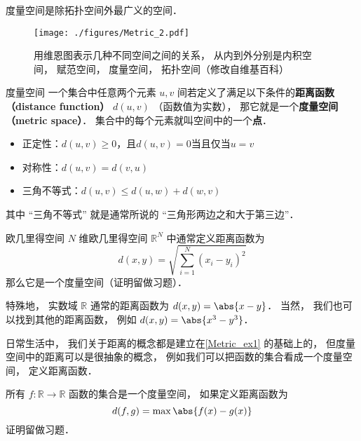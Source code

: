 

度量空间是除拓扑空间外最广义的空间．
\begin{figure}[ht]
\centering
\texttt{[image: ./figures/Metric\_2.pdf]}
\caption{用维恩图表示几种不同空间之间的关系， 从内到外分别是内积空间， 赋范空间， 度量空间， 拓扑空间（修改自维基百科）} \label{Metric_fig2}
\end{figure}

\begin{definition}{度量空间}
一个集合中任意两个元素 $u, v$ 间若定义了满足以下条件的\textbf{距离函数（distance function）} $d(u, v)$ （函数值为实数）， 那它就是一个\textbf{度量空间（metric space）}． 集合中的每个元素就叫空间中的一个\textbf{点}．
\begin{itemize}
\item 正定性：$d(u, v) \geq 0$，且$d(u, v)=0$当且仅当$u=v$
\item 对称性：$d(u, v) = d(v, u)$
\item 三角不等式：$d(u, v) \leqslant d(u, w) + d(w, v)$
\end{itemize}
\end{definition}
其中 “三角不等式” 就是通常所说的 “三角形两边之和大于第三边”． 

\begin{example}{欧几里得空间}\label{Metric_ex1}
$N$ 维欧几里得空间 $\mathbb R^N$ 中通常定义距离函数为
\begin{equation}
d(x, y) = \sqrt{\sum_{i=1}^N (x_i - y_i)^2}
\end{equation}
那么它是一个度量空间（证明留做习题）．

特殊地， 实数域 $\mathbb R$ 通常的距离函数为 $d(x, y) = \abs{x - y}$． 当然， 我们也可以找到其他的距离函数， 例如 $d(x, y) = \abs{x^3 - y^3}$．
\end{example}

日常生活中， 我们关于距离的概念都是建立在\autoref{Metric_ex1} 的基础上的， 但度量空间中的距离可以是很抽象的概念， 例如我们可以把函数的集合看成一个度量空间， 定义距离函数．
\begin{example}{}
所有 $f:\mathbb R \to \mathbb R$ 函数的集合是一个度量空间， 如果定义距离函数为
\begin{equation}
d(f, g) = \max{\abs{f(x) - g(x)}}
\end{equation}
证明留做习题．
\end{example}

